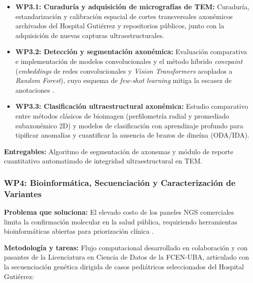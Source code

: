\documentclass[11pt,letterpaper]{article}
\begin{document}
\begin{itemize}[leftmargin=*,noitemsep,topsep=1pt]
    \item \textbf{WP3.1: Curaduría y adquisición de micrografías de TEM:} Curaduría, estandarización y calibración espacial de cortes transversales axonémicos archivados del Hospital Gutiérrez y repositorios públicos, junto con la adquisición de nuevas capturas ultraestructurales.
    \item \textbf{WP3.2: Detección y segmentación axonémica:} Evaluación comparativa e implementación de modelos convolucionales y el método híbrido \textit{convpaint} (\textit{embeddings} de redes convolucionales y \textit{Vision Transformers} acoplados a \textit{Random Forest}), cuyo esquema de \textit{few-shot learning} mitiga la escasez de anotaciones \cite{Shapiro2015,Wrona2025}.
    \item \textbf{WP3.3: Clasificación ultraestructural axonémica:} Estudio comparativo entre métodos clásicos de bioimagen (perfilometría radial y promediado subaxonémico 2D) y modelos de clasificación con aprendizaje profundo para tipificar anomalías y cuantificar la ausencia de brazos de dineína (ODA/IDA).
\end{itemize}

\textbf{Entregables:} Algoritmo de segmentación de axonemas y módulo de reporte cuantitativo automatizado de integridad ultraestructural en TEM.

\subsubsection*{WP4: Bioinformática, Secuenciación y Caracterización de Variantes}

\textbf{Problema que soluciona:} El elevado costo de los paneles NGS comerciales limita la confirmación molecular en la salud pública, requiriendo herramientas bioinformáticas abiertas para priorización clínica \cite{Collison2025}.

\textbf{Metodología y tareas:} Flujo computacional desarrollado en colaboración y con pasantes de la Licenciatura en Ciencia de Datos de la FCEN-UBA, articulado con la secuenciación genética dirigida de casos pediátricos seleccionados del Hospital Gutiérrez:
\end{document}
